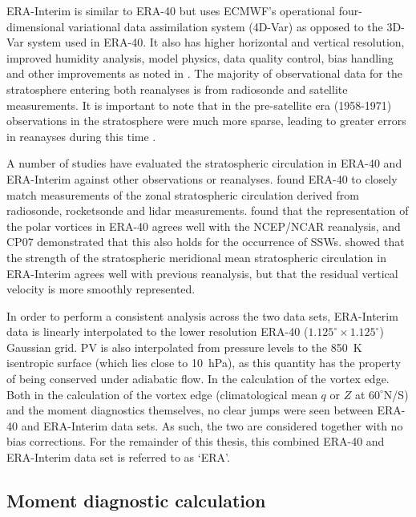 ERA-Interim is similar to ERA-40 but uses ECMWF’s operational four-dimensional
variational data assimilation system (4D-Var) as opposed to the 3D-Var system
used in ERA-40. It also has higher horizontal and vertical resolution, improved
humidity analysis, model physics, data quality control, bias handling and other
improvements as noted in \citet{Simmons2007}. The majority of observational data
for the stratosphere entering both reanalyses is from radiosonde and satellite
measurements. It is important to note that in the pre-satellite era (1958-1971)
observations in the stratosphere were much more sparse, leading to greater
errors in reanayses during this time \citep{Uppala2005}. 

A number of studies have evaluated the stratospheric circulation in ERA-40 and
ERA-Interim against other observations or reanalyses. \citet{Randel2004} found
ERA-40 to closely match measurements of the zonal stratospheric circulation
derived from radiosonde, rocketsonde and lidar
measurements. \citet{Karpetchko2005} found that the representation of the polar
vortices in ERA-40 agrees well with the NCEP/NCAR reanalysis, and CP07
demonstrated that this also holds for the occurrence of
SSWs. \citet{Seviour2012} showed that the strength of the stratospheric
meridional mean stratospheric circulation in ERA-Interim agrees well with
previous reanalysis, but that the residual vertical velocity is more smoothly
represented.

In order to perform a consistent analysis across the two data sets, ERA-Interim
data is linearly interpolated to the lower resolution ERA-40
($1.125^{\circ} \times 1.125^{\circ}$) Gaussian grid. PV is also interpolated
from pressure levels to the 850~K isentropic surface (which lies close to
10~hPa), as this quantity has the property of being conserved under adiabatic
flow. In the calculation of the vortex edge. Both in the calculation of the
vortex edge (climatological mean $q$ or $Z$ at $60^{\circ}$N/S) and the moment
diagnostics themselves, no clear jumps were seen between ERA-40 and ERA-Interim
data sets. As such, the two are considered together with no bias
corrections. For the remainder of this thesis, this combined ERA-40 and
ERA-Interim data set is referred to as `ERA'. 


\subsection{Moment diagnostic calculation}
\label{sec:vort-geom-calc}

